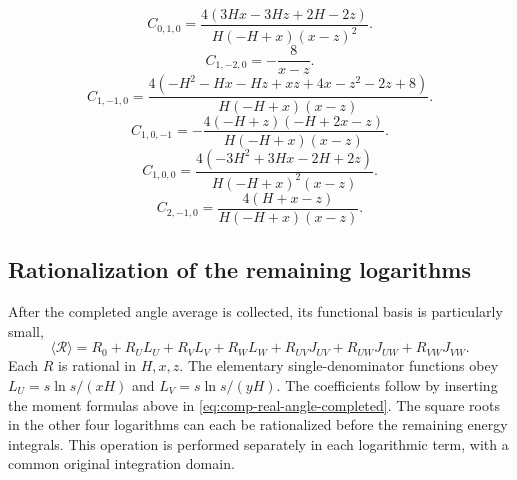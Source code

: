 \begin{equation}
C_{0,1,0}=\frac{4 \left(3 H x - 3 H z + 2 H - 2 z\right)}{H \left(- H + x\right) \left(x - z\right)^{2}}.
\end{equation}
\begin{equation}
C_{1,-2,0}=- \frac{8}{x - z}.
\end{equation}
\begin{equation}
C_{1,-1,0}=\frac{4 \left(- H^{2} - H x - H z + x z + 4 x - z^{2} - 2 z + 8\right)}{H \left(- H + x\right) \left(x - z\right)}.
\end{equation}
\begin{equation}
C_{1,0,-1}=- \frac{4 \left(- H + z\right) \left(- H + 2 x - z\right)}{H \left(- H + x\right) \left(x - z\right)}.
\end{equation}
\begin{equation}
C_{1,0,0}=\frac{4 \left(- 3 H^{2} + 3 H x - 2 H + 2 z\right)}{H \left(- H + x\right)^{2} \left(x - z\right)}.
\end{equation}
\begin{equation}
C_{2,-1,0}=\frac{4 \left(H + x - z\right)}{H \left(- H + x\right) \left(x - z\right)}.
\end{equation}

\subsection{Rationalization of the remaining logarithms}
After the completed angle average is collected, its functional
basis is particularly small,
\begin{equation}
 \langle\mathcal R\rangle=R_0+R_U L_U+R_V L_V+R_W L_W
                  +R_{UV}J_{UV}+R_{UW}J_{UW}+R_{VW}J_{VW}.
\end{equation}
Each $R$ is rational in $H,x,z$. The elementary single-denominator
functions obey $L_U=s\ln s/(xH)$ and $L_V=s\ln s/(yH)$.
The coefficients follow by inserting the moment formulas above in
\eqref{eq:comp-real-angle-completed}. The square roots in the other
four logarithms can each be rationalized before the remaining
energy integrals. This operation is performed separately in each
logarithmic term, with a common original integration domain.

